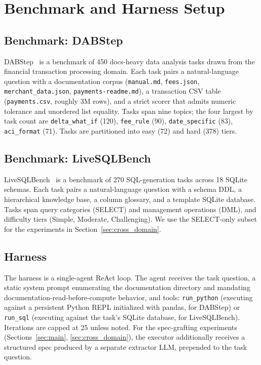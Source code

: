 \documentclass[conference]{IEEEtran}
\begin{document}
\section{Benchmark and Harness Setup}
\label{sec:setup}

\subsection{Benchmark: DABStep}
DABStep~\cite{dabstep2025} is a benchmark of 450 docs-heavy data analysis tasks drawn from the financial transaction processing domain. Each task pairs a natural-language question with a documentation corpus (\texttt{manual.md}, \texttt{fees.json}, \texttt{merchant\_data.json}, \texttt{payments-readme.md}), a transaction CSV table (\texttt{payments.csv}, roughly 3M rows), and a strict scorer that admits numeric tolerance and unordered list equality. Tasks span nine topics; the four largest by task count are \texttt{delta\_what\_if} (120), \texttt{fee\_rule} (90), \texttt{date\_specific} (83), \texttt{aci\_format} (71). Tasks are partitioned into easy (72) and hard (378) tiers.

\subsection{Benchmark: LiveSQLBench}
LiveSQLBench~\cite{birdInteract2025} is a benchmark of 270 SQL-generation tasks across 18 SQLite schemas. Each task pairs a natural-language question with a schema DDL, a hierarchical knowledge base, a column glossary, and a template SQLite database. Tasks span query categories (SELECT) and management operations (DML), and difficulty tiers (Simple, Moderate, Challenging). We use the SELECT-only subset for the experiments in Section~\ref{sec:cross_domain}.

\subsection{Harness}
The harness is a single-agent ReAct loop. The agent receives the task question, a static system prompt enumerating the documentation directory and mandating documentation-read-before-compute behavior, and tools: \texttt{run\_python} (executing against a persistent Python REPL initialized with pandas, for DABStep) or \texttt{run\_sql} (executing against the task's SQLite database, for LiveSQLBench). Iterations are capped at 25 unless noted. For the spec-grafting experiments (Sections~\ref{sec:main}, \ref{sec:cross_domain}), the executor additionally receives a structured spec produced by a separate extractor LLM, prepended to the task question.
\end{document}
